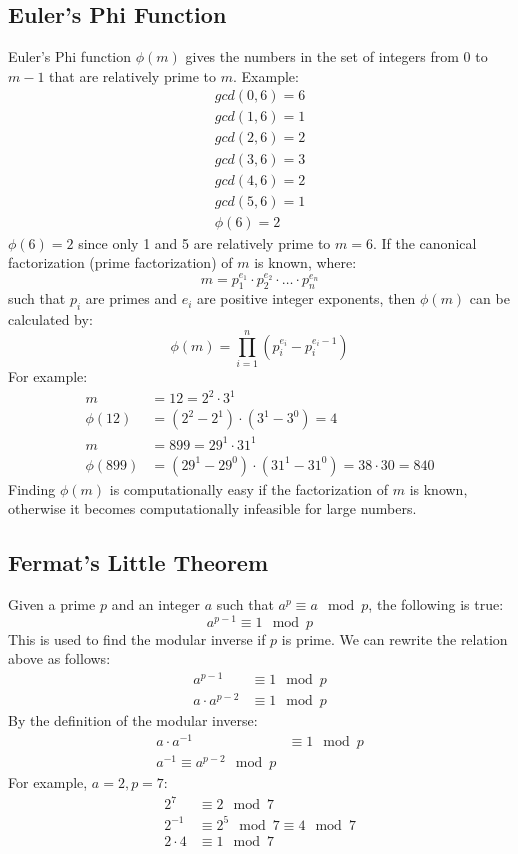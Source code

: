 \documentclass{math}
\begin{document}
\subsection*{Euler's Phi Function}
Euler's Phi function \( \phi(m) \) gives the numbers in the set of integers from
0 to \( m-1 \) that are relatively prime to \( m \). Example:
\begin{align*}
  gcd(0,6) = 6 \\
  gcd(1,6) = 1 \\
  gcd(2,6) = 2 \\
  gcd(3,6) = 3 \\
  gcd(4,6) = 2 \\
  gcd(5,6) = 1 \\
  \phi(6) = 2
\end{align*}
\( \phi(6) = 2 \) since only 1 and 5 are relatively prime to \( m = 6 \). If the
canonical factorization (prime factorization) of \( m \) is known, where:
\[ m = p_1^{e_1}\cdot p_2^{e_2}\cdot\dots\cdot p_n^{e_n} \]
such that \( p_i \) are primes and \( e_i \) are positive integer exponents,
then \( \phi(m) \) can be calculated by:
\[ \phi(m) = \prod_{i=1}^{n}(p_i^{e_i}-p_i^{e_i-1}) \]
For example:
\begin{align*}
  m &= 12 = 2^2\cdot3^1 \\
  \phi(12) &= (2^2-2^1)\cdot(3^1-3^0) = 4 \\
  m &= 899 = 29^1\cdot31^1 \\
  \phi(899) &= (29^1-29^0)\cdot(31^1-31^0) = 38\cdot30 = 840
\end{align*}
Finding \( \phi(m) \) is computationally easy if the factorization of \( m \) is
known, otherwise it becomes computationally infeasible for large numbers.

\subsection*{Fermat's Little Theorem}
Given a prime \( p \) and an integer \( a \) such that \( a^p \equiv a\mod p \),
the following is true:
\[ a^{p-1} \equiv 1\mod p \]
This is used to find the modular inverse if \( p \) is prime. We can rewrite
the relation above as follows:
\begin{align*}
  a^{p-1} &\equiv 1\mod p \\
  a\cdot a^{p-2} &\equiv 1\mod p
\end{align*}
By the definition of the modular inverse:
\begin{align*}
  a\cdot a^{-1} &\equiv 1\mod p \\
  a^{-1} \equiv a^{p-2}\mod p
\end{align*}
For example, \( a = 2, p = 7 \):
\begin{align*}
  2^7 &\equiv 2\mod7 \\
  2^{-1} &\equiv 2^5\mod7 \equiv 4\mod7 \\
  2\cdot4 &\equiv 1\mod 7
\end{align*}
\end{document}
